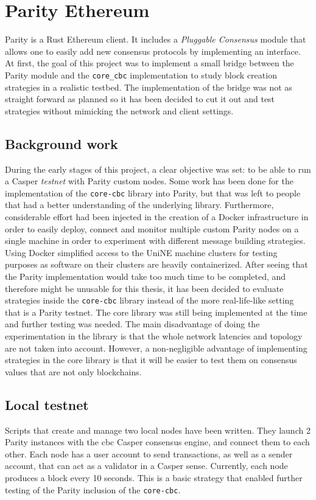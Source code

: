 \section{Parity Ethereum}
Parity is a Rust Ethereum client. It includes a \textit{Pluggable Consensus}
module that allows one to easily add new consensus protocols by implementing an
interface.  At first, the goal of this project was to implement a small bridge
between the Parity module and the \texttt{core\_cbc} implementation to study block creation
strategies in a realistic testbed. The implementation of the bridge was
not as straight forward as planned so it has been decided to cut it out and test
strategies without mimicking the network and client settings.

\subsection{Background work}
During the early stages of this project, a clear objective was set: to be able
to run a Casper \textit{testnet} with Parity custom nodes. Some work has been
done for the implementation of the \texttt{core-cbc} library into Parity, but
that was left to people that had a better understanding of the underlying
library. Furthermore, considerable effort had been injected in the creation of a
Docker infrastructure in order to easily deploy, connect and monitor multiple
custom Parity nodes on a single machine in order to experiment with different
message building strategies. Using Docker simplified access to the UniNE machine
clusters for testing purposes as software on their clusters are heavily
containerized. After seeing that the Parity implementation would take too much
time to be completed, and therefore might be unusable for this thesis, it has
been decided to evaluate strategies inside the \texttt{core-cbc} library instead
of the more real-life-like setting that is a Parity testnet. The core library
was still being implemented at the time and further testing was needed.  The
main disadvantage of doing the experimentation in the library is that the whole
network latencies and topology are not taken into account. However, a
non-negligible advantage of implementing strategies in the core library is that
it will be easier to test them on consensus values that are not only
blockchains.

\subsection{Local testnet}
Scripts that create and manage two local nodes have been written. They launch 2
Parity instances with the \gls{cbc} Casper consensus engine, and connect them
to each other. Each node has a user account to send transactions, as well as a
sender account, that can act as a validator in a Casper sense. Currently, each
node produces a block every 10 seconds. This is a basic strategy that enabled
further testing of the Parity inclusion of the \texttt{core-cbc}.

